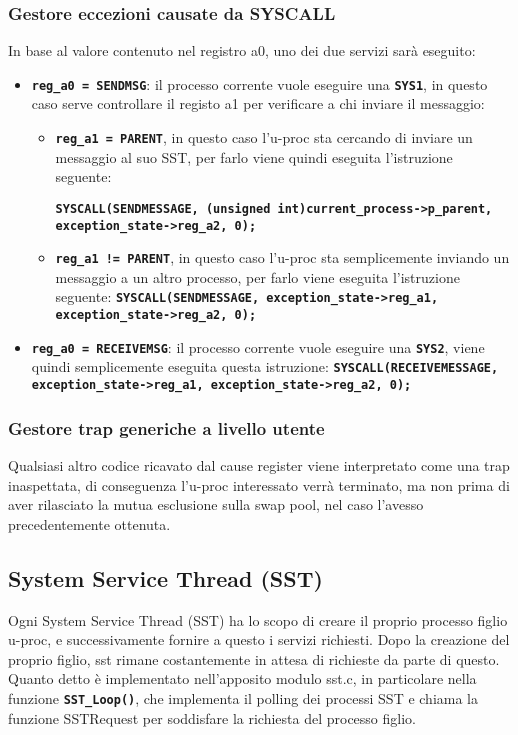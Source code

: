 \documentclass{article}
\begin{document}
\subsubsection{Gestore eccezioni causate da SYSCALL}
In base al valore contenuto nel registro a0, uno dei due servizi sarà eseguito:
\begin{itemize}
  \item \texttt{\textbf{reg\_a0 = SENDMSG}}: il processo corrente vuole eseguire una \texttt{\textbf{SYS1}},
    in questo caso serve controllare il registo a1 per verificare a chi inviare il messaggio:
    \begin{itemize}
      \item \texttt{\textbf{reg\_a1 = PARENT}}, in questo caso l'u-proc sta cercando di inviare 
        un messaggio al suo SST, per farlo viene quindi eseguita l'istruzione seguente: 

        \texttt{\textbf{SYSCALL(SENDMESSAGE, (unsigned int)current\_process->p\_parent, \newline 
        exception\_state->reg\_a2, 0);}}
      \item \texttt{\textbf{reg\_a1 != PARENT}}, in questo caso l'u-proc sta semplicemente inviando un 
        messaggio a un altro processo, per farlo viene eseguita l'istruzione seguente: \newline
        \texttt{\textbf{SYSCALL(SENDMESSAGE, exception\_state->reg\_a1, \newline 
        exception\_state->reg\_a2, 0);}}
    \end{itemize}
  \item \texttt{\textbf{reg\_a0 = RECEIVEMSG}}: il processo corrente vuole eseguire una \texttt{\textbf{SYS2}}, viene quindi semplicemente eseguita questa istruzione: \newline 
    \texttt{\textbf{SYSCALL(RECEIVEMESSAGE, exception\_state->reg\_a1, exception\_state->reg\_a2, 0);}}

\end{itemize}
\subsubsection{Gestore trap generiche a livello utente}
Qualsiasi altro codice ricavato dal cause register viene interpretato come una trap inaspettata, di 
conseguenza l'u-proc interessato verrà terminato, ma non prima di aver rilasciato la mutua esclusione 
sulla swap pool, nel caso l'avesso precedentemente ottenuta.


\subsection{System Service Thread (SST)}
Ogni System Service Thread (SST) ha lo scopo di creare il proprio processo figlio u-proc, e successivamente fornire a questo i servizi richiesti. Dopo la creazione del proprio figlio, sst rimane costantemente in attesa di richieste da parte di questo. Quanto detto è implementato nell'apposito modulo sst.c, in particolare nella funzione \texttt{\textbf{SST\_Loop()}}, che implementa il polling dei processi SST e chiama la funzione SSTRequest per soddisfare la richiesta del processo figlio.
\end{document}
